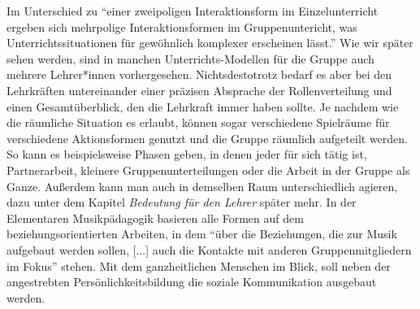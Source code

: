 Im Unterschied zu \enquote{einer zweipoligen Interaktionsform im
Einzelunterricht ergeben sich mehrpolige Interaktionsformen im Gruppenuntericht,
was Unterrichtssituationen für gewöhnlich komplexer erscheinen lässt.}
\autocite[30]{losert:die_kunst_zu_unterrichten} Wie wir später sehen werden,
sind in manchen Unterrichts-Modellen für die Gruppe auch mehrere Lehrer*innen
vorhergesehen. Nichtsdestotrotz bedarf es aber bei den Lehrkräften
untereinander einer präzisen Absprache der Rollenverteilung und einen
Gesamtüberblick, den die Lehrkraft immer haben sollte. Je nachdem wie die
räumliche Situation es erlaubt, können sogar verschiedene Spielräume für
verschiedene Aktionsformen genutzt und die Gruppe räumlich aufgeteilt werden. So
kann es beispielsweise Phasen geben, in denen jeder für sich tätig ist,
Partnerarbeit, kleinere Gruppenunterteilungen oder die Arbeit in der Gruppe als
Ganze. Außerdem kann man auch in demselben Raum unterschiedlich agieren, dazu
unter dem Kapitel \emph{Bedeutung für den Lehrer} später mehr. In der Elementaren
Musikpädagogik basieren alle Formen auf dem beziehungsorientierten Arbeiten, in
dem \enquote{über die Beziehungen, die zur Musik aufgebaut werden sollen, [...]
auch die Kontakte mit anderen Gruppenmitgliedern im Fokus}
\autocite[10]{dartsch:kern_des_musizierens} stehen. Mit dem ganzheitlichen
Menschen im Blick, soll neben der angestrebten Persönlichkeitsbildung die
soziale Kommunikation ausgebaut werden.
